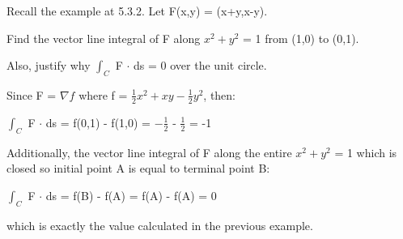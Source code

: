     \vspace{0.5cm}



    \begin{example}
        Recall the example at 5.3.2.
        Let F(x,y) = (x+y,x-y).
        
        Find the vector line integral of F along
        $x^2+y^2$ = 1 from (1,0) to (0,1).

        Also, justify why $\int_C$ F $\cdot$ ds = 0 over the unit circle.
    \end{example}

    \begin{tbox}
        Since F = $\nabla f$ where f = $\frac{1}{2}x^2 + xy - \frac{1}{2}y^2$,
        then:

        \hspace{0.5cm}
        $\int_C$ F $\cdot$ ds
        = f(0,1) - f(1,0) = $-\frac{1}{2}$ - $\frac{1}{2}$ = -1

        Additionally, the vector line integral of F along the entire $x^2+y^2$ = 1
        which is closed so initial point A is equal to terminal point B:

        \hspace{0.5cm}
        $\int_C$ F $\cdot$ ds = f(B) - f(A) = f(A) - f(A) = 0

        which is exactly the value calculated in the previous example.
    \end{tbox}




